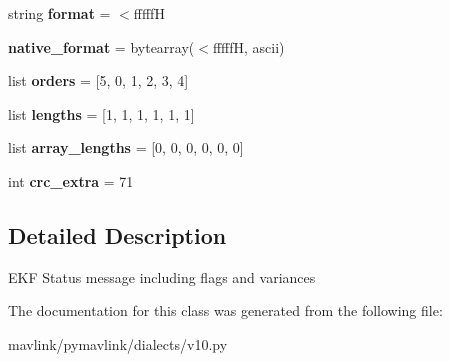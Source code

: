 \begin{DoxyCompactItemize}
string {\bfseries format} = \textquotesingle{}$<$fffffH\textquotesingle{}
\item 
\mbox{\label{classpymavlink_1_1dialects_1_1v10_1_1MAVLink__ekf__status__report__message_ad7c2a9b6be1328ed629453cca91577b2}} 
{\bfseries native\+\_\+format} = bytearray(\textquotesingle{}$<$fffffH\textquotesingle{}, \textquotesingle{}ascii\textquotesingle{})
\item 
\mbox{\label{classpymavlink_1_1dialects_1_1v10_1_1MAVLink__ekf__status__report__message_ace25274e51999c3ab5261a706e194187}} 
list {\bfseries orders} = \mbox{[}5, 0, 1, 2, 3, 4\mbox{]}
\item 
\mbox{\label{classpymavlink_1_1dialects_1_1v10_1_1MAVLink__ekf__status__report__message_a1b987cfc53cf35653b5743331213ef09}} 
list {\bfseries lengths} = \mbox{[}1, 1, 1, 1, 1, 1\mbox{]}
\item 
\mbox{\label{classpymavlink_1_1dialects_1_1v10_1_1MAVLink__ekf__status__report__message_a27ed14ab05b86c8be08898cce393fec0}} 
list {\bfseries array\+\_\+lengths} = \mbox{[}0, 0, 0, 0, 0, 0\mbox{]}
\item 
\mbox{\label{classpymavlink_1_1dialects_1_1v10_1_1MAVLink__ekf__status__report__message_a6a08a3ca52133672e6f03755e7c16ae4}} 
int {\bfseries crc\+\_\+extra} = 71
\end{DoxyCompactItemize}


\subsection{Detailed Description}
\begin{DoxyVerb}EKF Status message including flags and variances
\end{DoxyVerb}
 

The documentation for this class was generated from the following file\+:\begin{DoxyCompactItemize}
\item 
mavlink/pymavlink/dialects/v10.\+py\end{DoxyCompactItemize}
